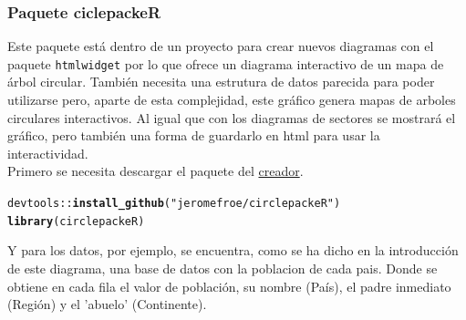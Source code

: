 \documentclass{article}\usepackage[]{graphicx}\usepackage[]{color}
\makeatletter
\newcommand{\hlstr}[1]{\textcolor[rgb]{0.192,0.494,0.8}{#1}}%
\newcommand{\hlopt}[1]{\textcolor[rgb]{0,0,0}{#1}}%
\newcommand{\hlstd}[1]{\textcolor[rgb]{0.345,0.345,0.345}{#1}}%
\newcommand{\hlkwd}[1]{\textcolor[rgb]{0.737,0.353,0.396}{\textbf{#1}}}%
\newenvironment{kframe}{%
 \def\at@end@of@kframe{}%
 \ifinner\ifhmode%
  \def\at@end@of@kframe{\end{minipage}}%
  \begin{minipage}{\columnwidth}%
 \fi\fi%
 \def\FrameCommand##1{\hskip\@totalleftmargin \hskip-\fboxsep
 \colorbox{shadecolor}{##1}\hskip-\fboxsep
     \hskip-\linewidth \hskip-\@totalleftmargin \hskip\columnwidth}%
 \MakeFramed {\advance\hsize-\width
   \@totalleftmargin\z@ \linewidth\hsize
   \@setminipage}}%
 {\par\unskip\endMakeFramed%
 \at@end@of@kframe}
\newenvironment{knitrout}{}{} %
\makeatother
\begin{document}
\subsubsection{Paquete ciclepackeR}
Este paquete %
est\'a dentro de un proyecto para crear nuevos diagramas con el paquete \texttt{htmlwidget} %
 por lo que ofrece un diagrama interactivo de un mapa de \'arbol circular. Tambi\'en necesita una estrutura de datos parecida para poder utilizarse pero, aparte de esta complejidad, este gr\'afico genera mapas de arboles circulares interactivos. Al igual que con los diagramas de sectores se mostrar\'a el gr\'afico, pero tambi\'en una forma de guardarlo en html para usar la interactividad.~\\
Primero se necesita descargar el paquete del \href{https://github.com/jeromefroe/circlepackeR}{creador}.
\begin{knitrout}
\color{fgcolor}\begin{kframe}
\begin{alltt}
\hlstd{devtools}\hlopt{::}\hlkwd{install_github}\hlstd{(}\hlstr{"jeromefroe/circlepackeR"}\hlstd{)}
\hlkwd{library}\hlstd{(circlepackeR)}
\end{alltt}
\end{kframe}
\end{knitrout}

Y para los datos, por ejemplo, se encuentra, como se ha dicho en la introducci\'on de este diagrama, una base de datos con la poblacion de cada pais. Donde se obtiene en cada fila el valor de poblaci\'on, su nombre (Pa\'is), el padre inmediato (Regi\'on) y el 'abuelo' (Continente).
\end{document}
